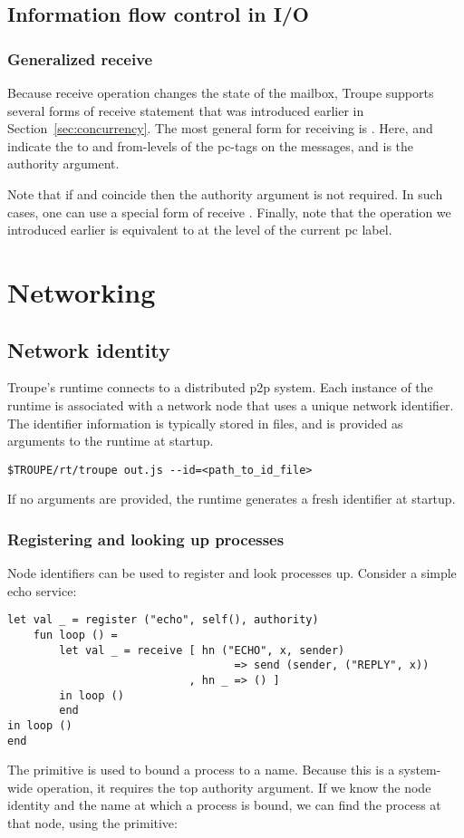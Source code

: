 \subsection{Information flow control in I/O}
\subsubsection{Generalized receive}
Because receive operation changes the state of the mailbox, Troupe supports several forms 
of receive statement that was introduced earlier in Section~\ref{sec:concurrency}. The most 
general form for receiving is . Here,  and 
indicate the to and from-levels of the pc-tags on the messages, and  is the authority
argument. 



Note that if  and  coincide then the authority argument
is not required. In such cases, one can use a special form of receive . 
Finally, note that the  operation we introduced earlier is equivalent to 
at the level of the current pc label.

\section{Networking}
\label{sec:network}

\subsection{Network identity}
Troupe's runtime connects to a distributed p2p system. 
Each instance of the runtime is associated with a network node that uses a
unique network identifier. The identifier information is typically stored in files,
and is provided as arguments to the runtime at startup.
\begin{verbatim}
$TROUPE/rt/troupe out.js --id=<path_to_id_file>    
\end{verbatim}
If no arguments are provided, the runtime generates a fresh identifier at startup.


\subsubsection{Registering and looking up processes}

Node identifiers can be used to register and look processes up.
Consider a simple echo service:
\label{example:echo}
\begin{lstlisting}
let val _ = register ("echo", self(), authority)
    fun loop () =
        let val _ = receive [ hn ("ECHO", x, sender) 
                                   => send (sender, ("REPLY", x))
                            , hn _ => () ]
        in loop ()
        end
in loop ()
end
\end{lstlisting}
The  primitive is used to bound a process to a name. Because this is a
system-wide operation, it requires the top authority argument.  If we know 
the node identity and the name at which a process is bound, we can find the process at that node, using the 
 primitive:


